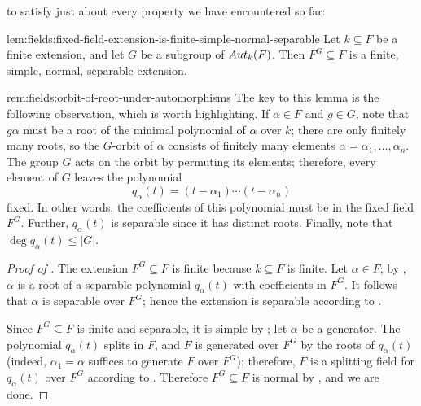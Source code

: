 to satisfy just about every property we have encountered so far:
\begin{lem}{}{lem:fields:fixed-field-extension-is-finite-simple-normal-separable}
  Let $k \subseteq F$ be a finite extension, and let $G$ be a subgroup
  of $Aut_k(F)$. Then $F^G \subseteq F$ is a finite, simple, normal,
  separable extension.
\end{lem}
\begin{rem}{}{rem:fields:orbit-of-root-under-automorphisms}
  The key to this lemma is the following observation, which is worth
  highlighting. If $\alpha \in F$ and $g \in G$, note that $g\alpha$
  must be a root of the minimal polynomial of $\alpha$ over $k$; there
  are only finitely many roots, so the $G$-orbit of $\alpha$ consists
  of finitely many elements $\alpha = \alpha_1, \dots, \alpha_n$. The
  group $G$ acts on the orbit by permuting its elements; therefore,
  every element of $G$ leaves the polynomial
  \[
    q_\alpha(t) = (t - \alpha_1) \cdots (t - \alpha_n)
  \]
  fixed. In other words, the coefficients of this polynomial must be
  in the fixed field $F^G$. Further, $q_\alpha(t)$ is separable since
  it has distinct roots. Finally, note that
  $\deg q_\alpha(t) \leq |G|$.
\end{rem}
\begin{proof}[Proof of ]
  The extension $F^G \subseteq F$ is finite because $k \subseteq F$ is
  finite. Let $\alpha \in F$; by , $\alpha$ is a
  root of a separable polynomial $q_\alpha(t)$ with coefficients in
  $F^G$. It follows that $\alpha$ is separable over $F^G$; hence the
  extension is separable according to .

  Since $F^G \subseteq F$ is finite and separable, it is simple by
  ; let $\alpha$ be a generator. The polynomial
  $q_\alpha(t)$ splits in $F$, and $F$ is generated over $F^G$ by the
  roots of $q_\alpha(t)$ (indeed, $\alpha_1 = \alpha$ suffices to
  generate $F$ over $F^G$); therefore, $F$ is a splitting field for
  $q_\alpha(t)$ over $F^G$ according to
  . Therefore $F^G \subseteq F$ is normal by
  , and we are done.
\end{proof}
